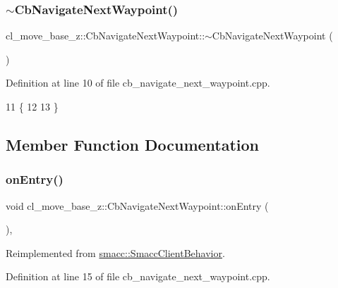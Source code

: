 \subsubsection{\texorpdfstring{$\sim$\+Cb\+Navigate\+Next\+Waypoint()}{~CbNavigateNextWaypoint()}}
{\footnotesize\ttfamily cl\+\_\+move\+\_\+base\+\_\+z\+::\+Cb\+Navigate\+Next\+Waypoint\+::$\sim$\+Cb\+Navigate\+Next\+Waypoint (\begin{DoxyParamCaption}{ }\end{DoxyParamCaption})\hspace{0.3cm}{\ttfamily [virtual]}}



Definition at line 10 of file cb\+\_\+navigate\+\_\+next\+\_\+waypoint.\+cpp.


\begin{DoxyCode}
11     \{
12 
13     \}
\end{DoxyCode}


\subsection{Member Function Documentation}
\mbox{\label{classcl__move__base__z_1_1CbNavigateNextWaypoint_a04913ef24344363669c1916b5df28493}} 
\subsubsection{\texorpdfstring{on\+Entry()}{onEntry()}}
{\footnotesize\ttfamily void cl\+\_\+move\+\_\+base\+\_\+z\+::\+Cb\+Navigate\+Next\+Waypoint\+::on\+Entry (\begin{DoxyParamCaption}{ }\end{DoxyParamCaption})\hspace{0.3cm}{\ttfamily [override]}, {\ttfamily [virtual]}}



Reimplemented from \hyperlink{classsmacc_1_1SmaccClientBehavior_ad5d3e1f1697c3cfe66c94cadba948493}{smacc\+::\+Smacc\+Client\+Behavior}.



Definition at line 15 of file cb\+\_\+navigate\+\_\+next\+\_\+waypoint.\+cpp.



